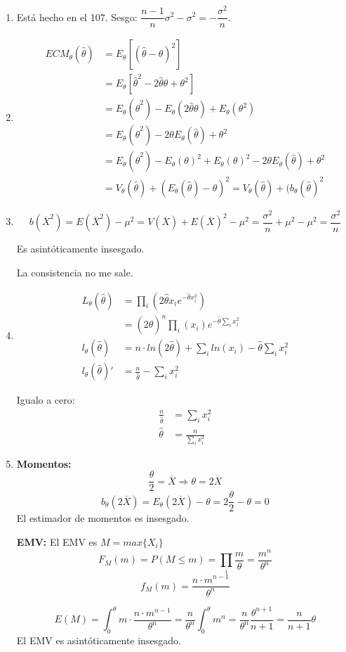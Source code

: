 \begin{enumerate}
	\item
		Está hecho en el 107. Sesgo: $\dfrac{n-1}{n}\sigma^2 - \sigma^2 = -\dfrac{\sigma^2}{n}$.
	\item
		\begin{align*}
			ECM_{\theta}(\hat\theta)	& = E_{\theta} [(\hat\theta - \theta)^2]						\\
										& = E_{\theta} [\hat\theta^2 - 2\hat\theta \theta + \theta^2]	\\
										& = E_{\theta} (\hat\theta^2) - E_{\theta}(2\hat\theta \theta) + E_{\theta}(\theta^2)	\\
										& = E_{\theta} (\hat\theta^2) - 2\theta E_{\theta}(\hat\theta) + \theta^2	\\
										& = E_{\theta} (\hat\theta^2) - E_{\theta}(\theta)^2 + E_{\theta}(\theta)^2 - 2\theta E_{\theta}(\hat\theta) + \theta^2	\\
										& = V_{\theta}(\hat\theta) + (E_{\theta}(\hat\theta)-\theta)^2 = V_{\theta}(\hat\theta) + (b_{\theta}(\hat\theta)^2
		\end{align*}
		
	\setcounter{enumi}{111}	
	\item
		$$b(\overline X^2) = E(\overline X^2) - \mu^2 = V(\overline X) + E(\overline X)^2 - \mu^2
			= \frac{\sigma^2}{n} + \mu^2 - \mu^2 = \frac{\sigma^2}{n}$$
			
		Es asintóticamente insesgado.
		
		La consistencia no me sale.
	\item
		\begin{align*}
			L_{\theta}(\hat \theta)		& = \prod_i \left(2\hat \theta x_i e^{-\hat \theta x_i^2}\right)		\\
										& = (2\hat \theta)^n \prod_i (x_i) e^{-\hat \theta \sum_i x_i^2}			\\
			l_{\theta}(\hat \theta)		& = n\cdot ln(2\hat \theta) + \sum_i ln(x_i) - \hat \theta \sum_i x_i^2	\\
			l_{\theta}(\hat \theta)'	& = \frac{n}{\hat \theta} - \sum_i x_i^2
		\end{align*}
		
		Igualo a cero:
		\begin{align*}
			\frac{n}{\hat \theta}	& = \sum_i x_i^2	\\
			\hat \theta				& = \frac{n}{\sum_i x_i^2}
		\end{align*}
	
	\item
		\textbf{Momentos:}
			$$\frac{\theta}{2} = \overline{X} \Rightarrow \theta = 2\overline X$$
			$$b_\theta(2\overline X) = E_\theta(2\overline X) - \theta = 2 \frac{\theta}{2} - \theta = 0$$
			El estimador de momentos es insesgado.
			
		\textbf{EMV:}
			El EMV es $M=max\{X_i\}$
			$$F_M(m) = P(M\leq m) = \prod_i \frac{m}{\theta} = \frac{m^n}{\theta^n}$$
			$$f_M(m) = \frac{n\cdot m^{n-1}}{\theta^n}$$
			
			$$E(M) = \int_0^{\theta} m\cdot \frac{n\cdot m^{n-1}}{\theta^n}
				= \frac{n}{\theta^n} \int_0^{\theta} m^n
				= \frac{n}{\theta^n} \frac{\theta^{n+1}}{n+1}
				= \frac{n}{n+1}\theta$$
			El EMV es asintóticamente insesgado.
\end{enumerate}
